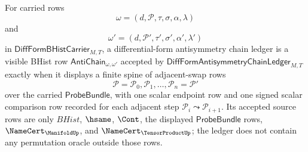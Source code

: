 \begin{definition}
\label{def:diffform-antisymmetry-chain-ledger}
For carried rows
$$
\omega=(d,\mathcal{P},\tau,\sigma,\alpha,\lambda)
$$
and
$$
\omega'=(d,\mathcal{P}',\tau',\sigma',\alpha',\lambda')
$$
in $\mathsf{DiffFormBHistCarrier}_{M,T}$, a differential-form antisymmetry
chain ledger is a visible BHist row
$\mathsf{AntiChain}_{\omega,\omega'}$ accepted by
$\mathsf{DiffFormAntisymmetryChainLedger}_{M,T}$ exactly when it displays a
finite spine of adjacent-swap rows
$$
\mathcal{P}=\mathcal{P}_0,\mathcal{P}_1,\ldots,\mathcal{P}_n=\mathcal{P}'
$$
over the carried $\mathsf{ProbeBundle}$, with one scalar endpoint row and one
signed scalar comparison row recorded for each adjacent step
$\mathcal{P}_i\leadsto\mathcal{P}_{i+1}$. Its accepted source rows are only
$BHist$, $\hsame$, $\Cont$, the displayed $\mathsf{ProbeBundle}$ rows,
$\NameCert_{\ManifoldUp}$, and $\NameCert_{\TensorProductUp}$; the ledger does
not contain any permutation oracle outside those rows.
\end{definition}


